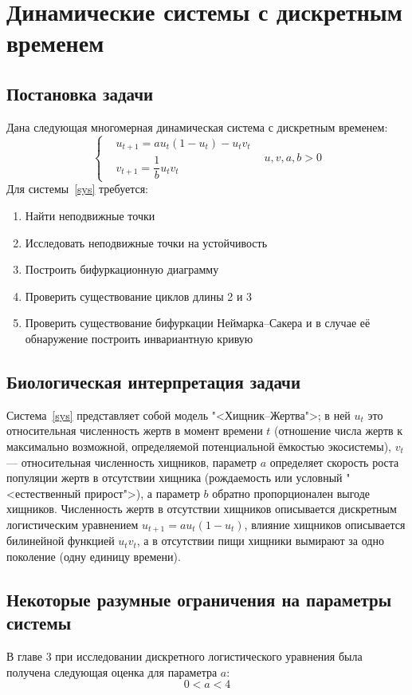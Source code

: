 \section{Динамические системы с дискретным временем}
\subsection{Постановка задачи}
Дана следующая многомерная динамическая система с дискретным временем:
\begin{equation}
    \label{sys}
    \left\{
    \begin{aligned}
        &u_{t+1} = au_t(1 - u_t) - u_tv_t&\\
        &v_{t+1} = \dfrac{1}{b}u_tv_t&
    \end{aligned}
    \right.u, v, a, b > 0
\end{equation}
Для системы~\eqref{sys} требуется:
\begin{enumerate}
    \item Найти неподвижные точки 
    \item Исследовать неподвижные точки на устойчивость
    \item Построить бифуркационную диаграмму
    \item Проверить существование циклов длины 2 и 3
    \item Проверить существование бифуркации Неймарка--Сакера и в случае её обнаружение построить инвариантную кривую
\end{enumerate}
\subsection{Биологическая интерпретация задачи}
Система~\eqref{sys} представляет собой модель "<Хищник--Жертва">; в ней \(u_t\) это относительная численность жертв в момент времени \(t\) (отношение числа жертв к максимально возможной, определяемой потенциальной ёмкостью экосистемы), \(v_t\) --- относительная численность хищников, параметр \(a\) определяет скорость роста популяции жертв в отсутствии хищника (рождаемость или условный "<естественный прирост">), а параметр \(b\) обратно пропорционален выгоде хищников. Численность жертв в отсутствии хищников описывается дискретным логистическим уравнением \(u_{t+1} = au_t(1 - u_t)\), влияние хищников описывается билинейной функцией \(u_tv_t\), а в отсутствии пищи хищники вымирают за одно поколение (одну единицу времени).
\subsection{Некоторые разумные ограничения на параметры системы}
В главе 3 \cite{Bratus} при исследовании дискретного логистического уравнения была получена следующая оценка для параметра \(a\):
\begin{equation}
    \label{a_bound}
    0 < a < 4
\end{equation}
